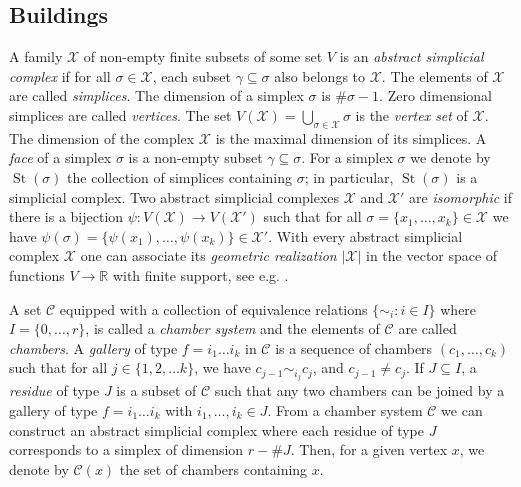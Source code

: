 \documentclass[11pt]{amsart}
\newcommand{\RR}{\mathbb{R}}
\newcommand{\calC}{\mathcal{C}}
\newcommand{\scrX}{\mathscr{X}}
\newcommand{\scrC}{\mathscr{C}}
\newcommand{\St}{\operatorname{St}}
\theoremstyle{plain}
\theoremstyle{definition}
\numberwithin{equation}{section}
\begin{document}
\subsection{Buildings}
\label{sec:1.1}
A family $\scrX$ of non-empty finite subsets of some set $V$ is an \emph{abstract simplicial complex}
if for all $\sigma \in \scrX$, each subset $\gamma \subseteq \sigma$ also belongs to $\scrX$. The elements of $\scrX$
are called \emph{simplices}. The dimension of a simplex $\sigma$ is $\#\sigma - 1$. Zero dimensional simplices are called
\emph{vertices}. The set $V(\scrX) = \bigcup_{\sigma \in \scrX} \sigma$ is the \emph{vertex set} of $\scrX$.
The dimension of the complex $\scrX$ is the maximal dimension of its simplices. A \emph{face} of a simplex $\sigma$
is a non-empty subset $\gamma \subseteq \sigma$. For a simplex $\sigma$  we denote by $\St(\sigma)$ the collection of
simplices containing $\sigma$; in particular, $\St(\sigma)$ is a simplicial complex. Two abstract simplicial complexes
$\scrX$ and $\scrX'$ are \emph{isomorphic} if there is a bijection $\psi: V(\scrX) \rightarrow V(\scrX')$ such that for
all $\sigma = \{x_1, \ldots, x_k\} \in \scrX$ we have $\psi(\sigma) = \{\psi(x_1), \ldots, \psi(x_k)\} \in \scrX'$.
With every abstract simplicial complex $\scrX$ one can associate its \emph{geometric realization} $|\scrX|$ in the vector 
space of functions $V \rightarrow \RR$ with finite support, see e.g. \cite[\S2]{Munkres1996}.
	
A set $\scrC$ equipped with a collection of equivalence relations $\{\sim_i : i \in I\}$ where $I = \{0, \ldots, r\}$,
is called a \emph{chamber system} and the elements of $\scrC$ are called \emph{chambers}. A \emph{gallery} of type
$f = i_1 \ldots i_k$ in $\scrC$ is a sequence of chambers $(c_1, \ldots, c_k)$ such that for all
$j \in \{1,2, \ldots k\}$, we have $c_{j-1} \sim_{i_j} c_j$, and $c_{j-1} \neq c_j$. If $J \subseteq I$, a \emph{residue} of 
type $J$ is a subset of $\scrC$ such that any two chambers can be joined by a gallery of type $f = i_1 \ldots i_k$ with
$i_1, \ldots, i_k \in J$. From a chamber system $\scrC$ we can construct an abstract simplicial complex where each
residue of type $J$ corresponds to a simplex of dimension $r - \#J$. Then, for a given vertex $x$, we denote by
$\calC(x)$ the set of chambers containing $x$. 
	
\end{document}
